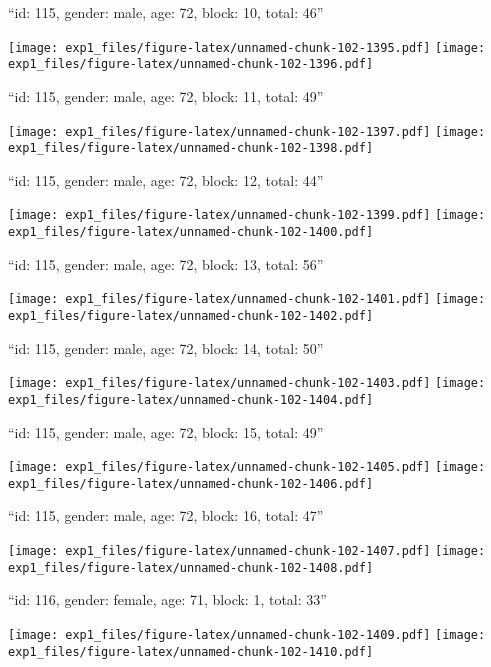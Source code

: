 \documentclass[11pt,,]{article}
\begin{document}
\newpage
[1] 

``id: 115, gender: male, age: 72, block: 10, total: 46''

\texttt{[image: exp1\_files/figure-latex/unnamed-chunk-102-1395.pdf]}
\texttt{[image: exp1\_files/figure-latex/unnamed-chunk-102-1396.pdf]}

\newpage
[1] 

``id: 115, gender: male, age: 72, block: 11, total: 49''

\texttt{[image: exp1\_files/figure-latex/unnamed-chunk-102-1397.pdf]}
\texttt{[image: exp1\_files/figure-latex/unnamed-chunk-102-1398.pdf]}

\newpage
[1] 

``id: 115, gender: male, age: 72, block: 12, total: 44''

\texttt{[image: exp1\_files/figure-latex/unnamed-chunk-102-1399.pdf]}
\texttt{[image: exp1\_files/figure-latex/unnamed-chunk-102-1400.pdf]}

\newpage
[1] 

``id: 115, gender: male, age: 72, block: 13, total: 56''

\texttt{[image: exp1\_files/figure-latex/unnamed-chunk-102-1401.pdf]}
\texttt{[image: exp1\_files/figure-latex/unnamed-chunk-102-1402.pdf]}

\newpage
[1] 

``id: 115, gender: male, age: 72, block: 14, total: 50''

\texttt{[image: exp1\_files/figure-latex/unnamed-chunk-102-1403.pdf]}
\texttt{[image: exp1\_files/figure-latex/unnamed-chunk-102-1404.pdf]}

\newpage
[1] 

``id: 115, gender: male, age: 72, block: 15, total: 49''

\texttt{[image: exp1\_files/figure-latex/unnamed-chunk-102-1405.pdf]}
\texttt{[image: exp1\_files/figure-latex/unnamed-chunk-102-1406.pdf]}

\newpage
[1] 

``id: 115, gender: male, age: 72, block: 16, total: 47''

\texttt{[image: exp1\_files/figure-latex/unnamed-chunk-102-1407.pdf]}
\texttt{[image: exp1\_files/figure-latex/unnamed-chunk-102-1408.pdf]}

\newpage
[1] 

``id: 116, gender: female, age: 71, block: 1, total: 33''

\texttt{[image: exp1\_files/figure-latex/unnamed-chunk-102-1409.pdf]}
\texttt{[image: exp1\_files/figure-latex/unnamed-chunk-102-1410.pdf]}
\end{document}
